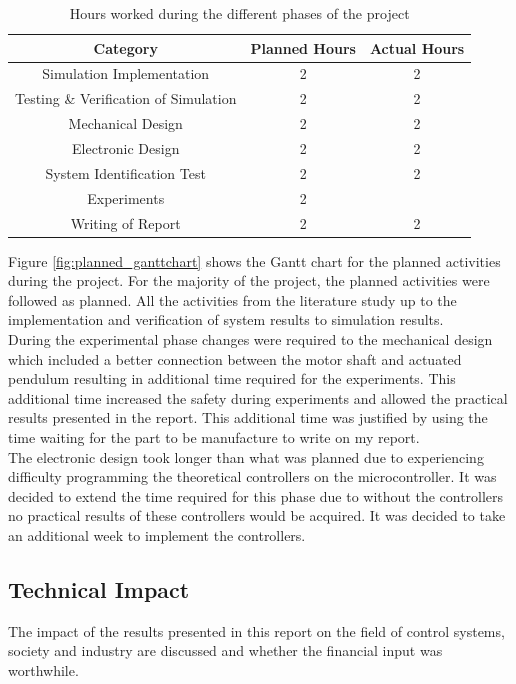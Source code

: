 \begin{table}[h]
	\centering
	\begin{tabular}{|c|c|c|}
		\hline
		Category & Planned Hours & Actual Hours \\
		\hline
		\hline
		Simulation Implementation & 2 & 2 \\
		\hline
		Testing \& Verification of Simulation & 2 & 2 \\
		\hline 
		Mechanical Design  & 2 & 2 \\
		\hline
		Electronic Design & 2 & 2 \\
		\hline
		System Identification Test & 2 & 2 \\
		\hline
		Experiments & 2 & \\
		\hline
		Writing of Report & 2 & 2 \\
		\hline
		
	\end{tabular}
	\caption{Hours worked during the different phases of the project}
	\label{table:hours_worked}
	
\end{table}

Figure \ref{fig:planned_ganttchart} shows the Gantt chart for the planned activities during the project. For the majority of the project, the planned activities were followed as planned. All the activities from the literature study up to the implementation and verification of system results to simulation results.\\

During the experimental phase changes were required to the mechanical design which included a better connection between the motor shaft and actuated pendulum resulting in additional time required for the experiments. This additional time increased the safety during experiments and allowed the practical results presented in the report. This additional time was justified by using the time waiting for the part to be manufacture to write on my report.\\	

The electronic design took longer than what was planned due to experiencing difficulty programming the theoretical controllers on the microcontroller. It was decided to extend the time required for this phase due to without the controllers no practical results of these controllers would be acquired. It was decided to take an additional week to implement the controllers.\\

\subsection{Technical Impact}
The impact of the results presented in this report on the field of control systems, society and industry are discussed and whether the financial input was worthwhile.\\

